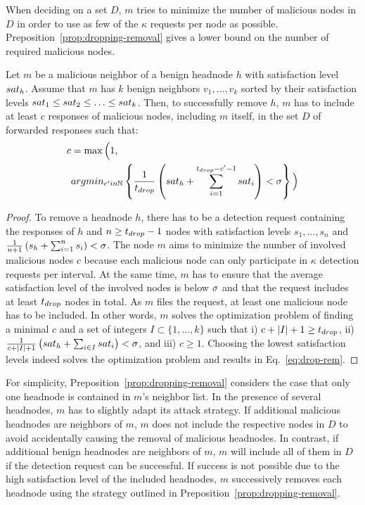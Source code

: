 When deciding on a set $D$, $m$ tries to minimize the number of malicious nodes in $D$ in order to use as few of the $\kappa$ requests per node as possible. 
Preposition~\ref{prop:dropping-removal} gives a lower bound on the number of required malicious nodes. 


  
 

\begin{proposition}
\label{prop:dropping-removal}
Let $m$ be a malicious neighbor of a benign headnode $h$ with satisfaction level $sat_h$. Assume that $m$ has $k$ benign neighbors $v_1, \ldots , v_k$ sorted by their satisfaction levels $sat_1 \leq sat_2 \leq \ldots  \leq sat_k$. 
Then, to successfully remove $h$, $m$ has to include at least $c$ responses of malicious nodes, including $m$ itself, in the set $D$ of forwarded responses such that:
\begin{align}
\label{eq:drop-rem}
c &= \max \Big( 1,  \\
 & argmin_{c' in \mathbb{N}} 
\left\lbrace \frac{1}{\minP}\left(\sat_h+\sum_{i=1}^{\minP-c'-1}\sat_i \right) < \satThres \right\rbrace 
\Big) \nonumber 
\end{align}
\end{proposition}
\begin{proof}
To remove a headnode $h$, there has to be a detection request containing the responses of $h$ and $n\geq t_{drop}-1$ nodes with satisfaction levels $s_1, \ldots , s_n$ and 
$\frac{1}{n+1}\left( s_h + \sum_{i=1}^{n}s_i \right) < \sigma$.
The node $m$ aims to minimize the number of involved malicious nodes $c$ because each malicious node can only participate in $\kappa$ detection requests per interval. At the same time, $m$ has to ensure that the average satisfaction level of the involved nodes is below $\sigma$ and that the request includes at least $t_{drop}$ nodes in total. As $m$ files the request, at least one malicious node has to be included. 
In other words, $m$ solves the optimization problem of finding a minimal $c$ and a set of integers $I \subset \{1, \ldots, k\}$ such that i) $c + |I|+1 \geq t_{drop}$, ii) $\frac{1}{c + |I|+1}\left( sat_h + \sum_{i \in I} sat_i \right) < \sigma$, and iii) $c\geq 1$. 
Choosing the lowest satisfaction levels indeed solves the optimization problem and results in Eq.~\ref{eq:drop-rem}. 
\end{proof}

For simplicity, Preposition~\ref{prop:dropping-removal} considers the case that only one headnode is contained in $m$'s neighbor list. In the presence of several headnodes, $m$ has to slightly adapt its attack strategy. 
If additional malicious headnodes are neighbors of $m$, $m$ does not include the respective nodes in $D$ to avoid accidentally causing the removal of malicious headnodes.  In contrast, if additional benign headnodes are neighbors of $m$, $m$ will include all of them in $D$ if the detection request can be successful. If success is not possible due to the high satisfaction level of the included headnodes, $m$ successively removes each headnode using the strategy outlined in Preposition~\ref{prop:dropping-removal}. 


